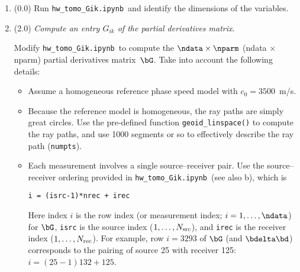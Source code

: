 \documentclass[11pt,titlepage,fleqn]{article}
\newcommand{\tfileGik}{{\tt hw\_tomo\_Gik.ipynb}}
\begin{document}
\begin{enumerate}
\begin{enumerate}
\item (0.5) Show how  can be expressed as
%
\begin{equation}
\bdelta\bd = \bG\,\bdelta\bem,
\end{equation}
%
where the data vector is given by
%
\begin{equation}
\bdelta\bd = (\delta T_1,\ldots,\delta T_i,\ldots,\delta T_\ndata)^T,
\label{d}
\end{equation}
%
and the model vector is given by
%
\begin{equation}
\bdelta\bem = (\delta m_1,\ldots,\delta m_k,\ldots,\delta m_\nparm)^T,
\label{m}
\end{equation}
%
Write your final equation in matrix-vector schematic form, as done in \verb+lab_linefit+ (line) and \verb+hw_inv+ (ellipse).

Write the expression for the $G_{ik}$ entry of the partial derivatives matrix~$\bG$.
\end{enumerate}


\item (0.0) Run \tfileGik\ and identify the dimensions of the variables.


\item (2.0) {\em Compute an entry $G_{ik}$ of the partial derivatives matrix}. 

Modify \tfileGik\ to compute the $\ndata \times \nparm$ (ndata $\times$ nparm) partial derivatives matrix~$\bG$.
Take into account the following details:
%
\begin{itemize}
\item Assume a homogeneous reference phase speed model with $c_0 = 3500$~m/s.

\item Because the reference model is homogeneous, the ray paths are simply great circles.  Use the pre-defined function \verb+geoid_linspace()+ to compute the ray paths, and use 1000 segments or so to effectively describe the ray path (\verb+numpts+).

\item Each measurement involves a single source--receiver pair. Use the source--receiver ordering provided in \tfileGik\ (see also b), which is
%
\begin{verbatim}
i = (isrc-1)*nrec + irec
\end{verbatim}
%
Here index $i$ is the row index (or measurement index; $i = 1,\ldots,\ndata$) for $\bG$, \verb+isrc+ is the source index ($1, \ldots, N_{\rm src}$), and \verb+irec+ is the receiver index ($1, \ldots, N_{\rm rec}$). For example, row $i=3293$ of $\bG$ (and $\bdelta\bd$) corresponds to the pairing of source 25 with receiver 125: $i=(25-1)132 + 125$.


\end{itemize}
\end{enumerate}
\end{document}
